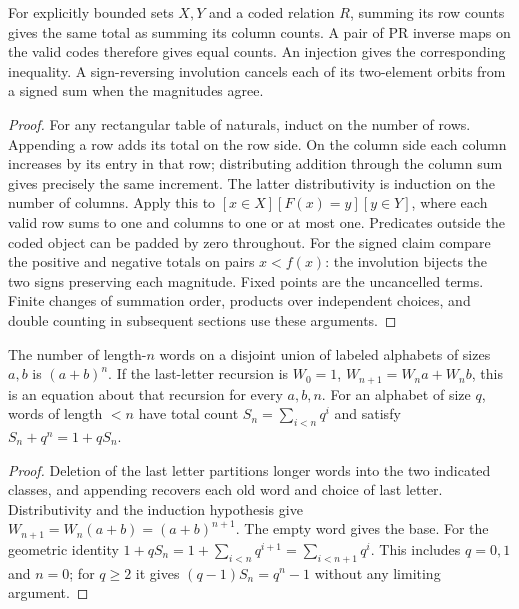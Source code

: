 \begin{lemma}\label{result02}\label{lem:fiber}
For explicitly bounded sets $X,Y$ and a coded relation $R$, summing its row counts gives the same total as summing its column counts. A pair of PR inverse maps on the valid codes therefore gives equal counts. An injection gives the corresponding inequality. A sign-reversing involution cancels each of its two-element orbits from a signed sum when the magnitudes agree.
\end{lemma}
\begin{proof}
For any rectangular table of naturals, induct on the number of rows. Appending a row adds its total on the row side. On the column side each column increases by its entry in that row; distributing addition through the column sum gives precisely the same increment. The latter distributivity is induction on the number of columns. Apply this to $[x\in X][F(x)=y][y\in Y]$, where each valid row sums to one and columns to one or at most one. Predicates outside the coded object can be padded by zero throughout. For the signed claim compare the positive and negative totals on pairs $x<f(x)$: the involution bijects the two signs preserving each magnitude. Fixed points are the uncancelled terms. Finite changes of summation order, products over independent choices, and double counting in subsequent sections use these arguments.
\end{proof}

\begin{proposition}\label{result03}\label{prop:weighted}
The number of length-$n$ words on a disjoint union of labeled alphabets of sizes $a,b$ is $(a+b)^n$. If the last-letter recursion is $W_0=1$, $W_{n+1}=W_na+W_nb$, this is an equation about that recursion for every $a,b,n$. For an alphabet of size $q$, words of length $<n$ have total count $S_n=\sum_{i<n}q^i$ and satisfy $S_n+q^n=1+qS_n$.
\end{proposition}
\begin{proof}
Deletion of the last letter partitions longer words into the two indicated classes, and appending recovers each old word and choice of last letter. Distributivity and the induction hypothesis give $W_{n+1}=W_n(a+b)=(a+b)^{n+1}$. The empty word gives the base. For the geometric identity $1+qS_n=1+\sum_{i<n}q^{i+1}=\sum_{i<n+1}q^i$. This includes $q=0,1$ and $n=0$; for $q\ge2$ it gives $(q-1)S_n=q^n-1$ without any limiting argument.
\end{proof}
